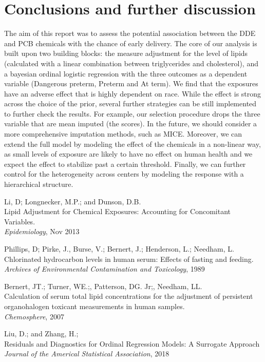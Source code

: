 \documentclass[10pt]{jmlr}%
\begin{document}
\section{Conclusions and further discussion}
\label{sec:conclusion}
The aim of this report was to assess the potential association between the DDE and PCB chemicals with the chance of early delivery. The core of our analysis is built upon two building blocks: the measure adjustment for the level of lipids (calculated with a linear combination between triglycerides and cholesterol), and a bayesian ordinal logistic regression with the three outcomes as a dependent variable (Dangerous preterm, Preterm and At term). We find that the exposures have an adverse  effect that is highly dependent on race. While the effect is strong across the choice of the prior, several further strategies can be still implemented to further check the results. For example, our selection procedure drops the three variable that are mean imputed (the scores). In the future, we should consider a more comprehensive imputation methods, such as MICE. Moreover, we can extend the full model by modeling  the effect of the chemicals in a non-linear way,  as small levels of exposure are likely to have no effect on human health and we expect the effect to stabilize past a certain threshold. Finally, we can further control for the heterogeneity across centers by modeling the response with a hierarchical structure.


\newpage %
\begin{thebibliography}{99} %
	
	 Li, D; Longnecker, M.P.; and Dunson, D.B. \\
	\newblock Lipid Adjustment for Chemical Exposures: Accounting for Concomitant Variables.\\
	\newblock \emph{Epidemiology}, Nov 2013
	
	 Phillips, D; Pirke, J., Burse, V.; Bernert, J.; Henderson, L.; Needham, L.\\
	\newblock Chlorinated hydrocarbon levels in human serum: Effects of fasting and feeding.\\
	\newblock \emph{Archives of Environmental Contamination and Toxicology}, 1989
	
	 Bernert, JT.; Turner, WE.;, Patterson, DG. Jr;, Needham, LL.\\
	\newblock Calculation of serum total lipid concentrations for the adjustment of persistent organohalogen toxicant measurements in human samples.\\
	\newblock \emph{Chemosphere}, 2007
	
	 Liu, D.; and Zhang, H.;\\
	\newblock Residuals and Diagnostics for Ordinal Regression Models: A Surrogate Approach\\
	\newblock \emph{Journal of the Americal Statistical Association}, 2018
	
\end{thebibliography}
\end{document}
